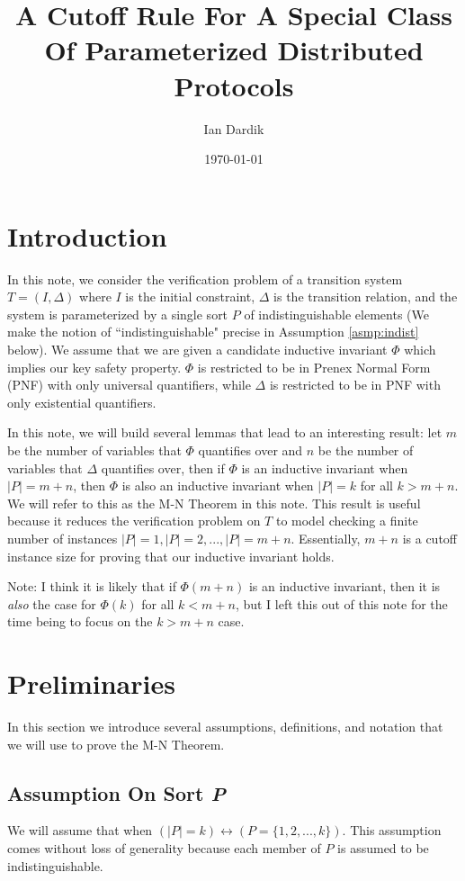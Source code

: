 \documentclass[12pt]{article}
\title{A Cutoff Rule For A Special Class Of Parameterized Distributed Protocols}
\author{Ian Dardik}
\date{\today}
\theoremstyle{definition}
\theoremstyle{remark}
\begin{document}
\maketitle

\section{Introduction}
In this note, we consider the verification problem of a transition system $T=(I,\Delta)$ where $I$ is the initial constraint, $\Delta$ is the transition relation, and the system is parameterized by a single sort $P$ of indistinguishable elements (We make the notion of ``indistinguishable" precise in Assumption \ref{asmp:indist} below).  We assume that we are given a candidate inductive invariant $\Phi$ which implies our key safety property.  $\Phi$ is restricted to be in Prenex Normal Form (PNF) with only universal quantifiers, while $\Delta$ is restricted to be in PNF with only existential quantifiers.

In this note, we will build several lemmas that lead to an interesting result: let $m$ be the number of variables that $\Phi$ quantifies over and $n$ be the number of variables that $\Delta$ quantifies over, then if $\Phi$ is an inductive invariant when $|P|=m+n$, then $\Phi$ is also an inductive invariant when $|P|=k$ for all $k>m+n$.  We will refer to this as the M-N Theorem in this note.  This result is useful because it reduces the verification problem on $T$ to model checking a finite number of instances $|P|=1,|P|=2,...,|P|=m+n$.  Essentially, $m+n$ is a cutoff instance size for proving that our inductive invariant holds.

Note: I think it is likely that if $\Phi(m+n)$ is an inductive invariant, then it is \textit{also} the case for $\Phi(k)$ for all $k<m+n$, but I left this out of this note for the time being to focus on the $k>m+n$ case.



\section{Preliminaries}
In this section we introduce several assumptions, definitions, and notation that we will use to prove the M-N Theorem.

\subsection{Assumption On Sort \textit{P}}
We will assume that when $(|P|=k) \leftrightarrow (P = \{1,2,...,k\})$.  This assumption comes without loss of generality because each member of $P$ is assumed to be indistinguishable.
\end{document}
